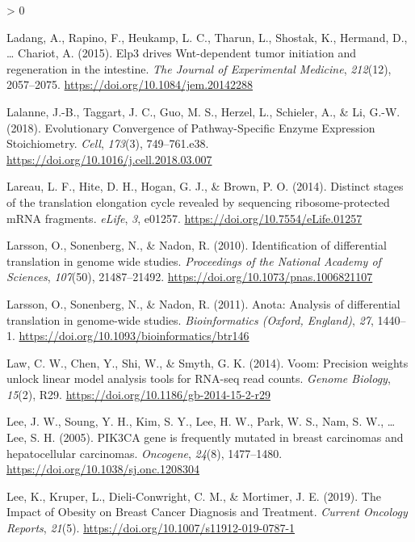 \documentclass[
  12pt,
  openany]{book}
\newlength{\cslhangindent}
\newenvironment{CSLReferences}[2] %
 {%
  \setlength{\parindent}{0pt}
  \ifodd #1 \everypar{\setlength{\hangindent}{\cslhangindent}}\ignorespaces\fi
  \ifnum #2 > 0
  \setlength{\parskip}{#2\baselineskip}
  \fi
 }%
 {}
\begin{document}
\begin{CSLReferences}{1}{0}
\leavevmode\hypertarget{ref-Ladang2015}{}%
Ladang, A., Rapino, F., Heukamp, L. C., Tharun, L., Shostak, K., Hermand, D., \ldots{} Chariot, A. (2015). Elp3 drives {Wnt}-dependent tumor initiation and regeneration in the intestine. \emph{The Journal of Experimental Medicine}, \emph{212}(12), 2057--2075. \url{https://doi.org/10.1084/jem.20142288}

\leavevmode\hypertarget{ref-Lalanne2018}{}%
Lalanne, J.-B., Taggart, J. C., Guo, M. S., Herzel, L., Schieler, A., \& Li, G.-W. (2018). Evolutionary {Convergence} of {Pathway}-{Specific Enzyme Expression Stoichiometry}. \emph{Cell}, \emph{173}(3), 749--761.e38. \url{https://doi.org/10.1016/j.cell.2018.03.007}

\leavevmode\hypertarget{ref-Lareau2014}{}%
Lareau, L. F., Hite, D. H., Hogan, G. J., \& Brown, P. O. (2014). Distinct stages of the translation elongation cycle revealed by sequencing ribosome-protected {mRNA} fragments. \emph{eLife}, \emph{3}, e01257. \url{https://doi.org/10.7554/eLife.01257}

\leavevmode\hypertarget{ref-Larsson2010}{}%
Larsson, O., Sonenberg, N., \& Nadon, R. (2010). Identification of differential translation in genome wide studies. \emph{Proceedings of the National Academy of Sciences}, \emph{107}(50), 21487--21492. \url{https://doi.org/10.1073/pnas.1006821107}

\leavevmode\hypertarget{ref-Larsson2011}{}%
Larsson, O., Sonenberg, N., \& Nadon, R. (2011). Anota: {Analysis} of differential translation in genome-wide studies. \emph{Bioinformatics (Oxford, England)}, \emph{27}, 1440--1. \url{https://doi.org/10.1093/bioinformatics/btr146}

\leavevmode\hypertarget{ref-Law2014}{}%
Law, C. W., Chen, Y., Shi, W., \& Smyth, G. K. (2014). Voom: Precision weights unlock linear model analysis tools for {RNA}-seq read counts. \emph{Genome Biology}, \emph{15}(2), R29. \url{https://doi.org/10.1186/gb-2014-15-2-r29}

\leavevmode\hypertarget{ref-Lee2005}{}%
Lee, J. W., Soung, Y. H., Kim, S. Y., Lee, H. W., Park, W. S., Nam, S. W., \ldots{} Lee, S. H. (2005). {PIK3CA} gene is frequently mutated in breast carcinomas and hepatocellular carcinomas. \emph{Oncogene}, \emph{24}(8), 1477--1480. \url{https://doi.org/10.1038/sj.onc.1208304}

\leavevmode\hypertarget{ref-Lee2019}{}%
Lee, K., Kruper, L., Dieli-Conwright, C. M., \& Mortimer, J. E. (2019). The {Impact} of {Obesity} on {Breast Cancer Diagnosis} and {Treatment}. \emph{Current Oncology Reports}, \emph{21}(5). \url{https://doi.org/10.1007/s11912-019-0787-1}


\end{CSLReferences}
\end{document}
